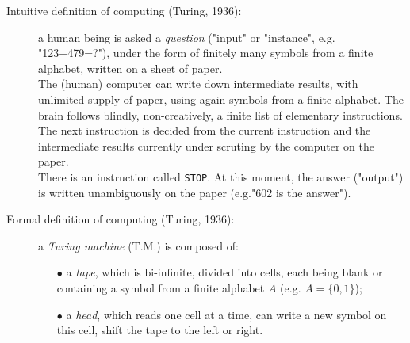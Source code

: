\begin{description}
\item[Intuitive definition of computing (Turing, 1936):] a human being is asked a \emph{question} ("input" or "instance", e.g. "123+479=?"), under the form of finitely many symbols from a finite alphabet, written on a sheet of paper.\\
The (human) computer can write down intermediate results, with unlimited supply of paper, using again symbols from a finite alphabet. The brain follows blindly, non-creatively, a finite list of elementary instructions. The next instruction is decided from the current instruction and the intermediate results currently under scruting by the computer on the paper.\\
There is an instruction called \texttt{STOP}. At this moment, the answer ("output") is written unambiguously on the paper (e.g."602 is the answer").

\item[Formal definition of computing (Turing, 1936):] a \emph{Turing machine} (T.M.) is composed of: 
\begin{itemize}
\item[$\bullet$] a \emph{tape}, which is bi-infinite, divided into cells, each being blank or containing a symbol from a finite alphabet $A$ (e.g. $A=\{0,1\}$);
\item[$\bullet$] a \emph{head}, which reads one cell at a time, can write a new symbol on this cell, shift the tape to the left or right.

\begin{center}
\end{center}


\end{itemize}
\end{description}
